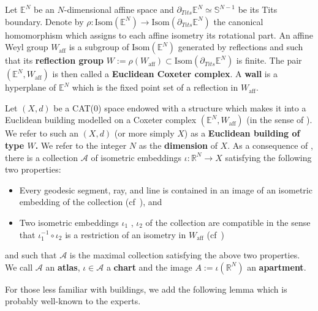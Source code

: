 \documentclass[12pt]{amsart}
\theoremstyle{definition}
\numberwithin{equation}{section}
\newcommand{\R}{\mathbb R}
\newcommand{\Sp}{\mathbb S}
\begin{document}
Let $\mathbb E^N$ be an $N$-dimensional affine space and  $\partial_{Tits} \mathbb E^N\simeq \Sp^{N-1}$ be its Tits boundary.  Denote by  $\rho:\mathrm{Isom}(\mathbb E^N) \to \mathrm{Isom}(\partial_{Tits} \mathbb E^N)$ the canonical homomorphism which assigns to  each affine isometry its rotational part.  An affine Weyl group $W_{\mathrm{aff}}$ is a subgroup of $\mbox{Isom}(\mathbb E^N)$  generated by reflections and such that its {\bf reflection group} $W := \rho(W_{\mathrm{aff}}) \subset \mbox{Isom}(\partial_{Tits} \mathbb E^N)$ is finite.  The pair  $(\mathbb E^N, W_{\mathrm{aff}})$ is then called a {\bf Euclidean Coxeter complex}.  A {\bf wall} is a hyperplane of $\mathbb E^N$ which is the fixed point set of a reflection in $W_{\mathrm{aff}}$.



Let $(X,d)$ be a CAT(0) space endowed with a structure which makes it into a Euclidean building  modelled   on a Coxeter complex $(\mathbb E^N, W_{\mathrm{aff}})$ (in the sense of \cite[Section 4.1.2]{kleiner-leeb}). 
{We refer to such an $(X,d)$ (or more simply $X$) as a {\bf Euclidean building of type $W$.}
}
  We refer to the integer $N$ as the  {\bf dimension} of $X$.
As a consequence of \cite[Corollary 4.6.2]{kleiner-leeb},   there is a collection $\mathcal A$ of isometric embeddings $\iota : \R^N  \rightarrow X$ satisfying the following two properties: 
\begin{itemize}
\item Every geodesic segment, ray, and line is contained in an image of an isometric embedding of  the collection  (cf~\cite[EB3]{kleiner-leeb}), and 
\item Two isometric embeddings $\iota_1$ , $\iota_2$ of the  collection are compatible in the sense that $\iota_1^{-1} \circ \iota_2$ is a restriction of an isometry in $W_{\mathrm{aff}}$  (cf~\cite[EB4]{kleiner-leeb}) 
\end{itemize}
and such that $\mathcal A$ is the maximal collection satisfying the above two properties.
  We call $\mathcal A$ an {\bf atlas}, $\iota \in \mathcal A$ a {\bf chart} and the image   $A:=\iota(\R^N)$ an {\bf apartment}.  



For those less familiar with buildings, we add the following lemma which is probably well-known to the experts.
\end{document}
